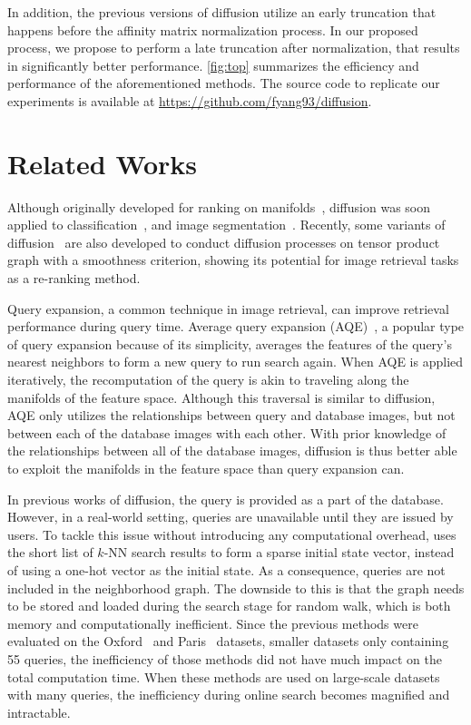 \documentclass[letterpaper]{article} \usepackage{aaai19}  \usepackage{times}  \usepackage{helvet}  \usepackage{courier}  \usepackage{url}  \usepackage{graphicx}  \frenchspacing  \setlength{\pdfpagewidth}{8.5in}  \setlength{\pdfpageheight}{11in}
\begin{document}
In addition, the previous versions of diffusion utilize an early truncation that happens before the affinity matrix normalization process.
In our proposed process, we propose to perform a late truncation after normalization, that results in significantly better performance.
\cref{fig:top} summarizes the efficiency and performance of the aforementioned methods.
The source code to replicate our experiments is available at \url{https://github.com/fyang93/diffusion}.


\section{Related Works}

Although originally developed for ranking on manifolds~\cite{page1999pagerank,zhou2004ranking,donoser2013diffusion}, diffusion was soon applied to classification~\cite{zhou2004learning}, and image segmentation~\cite{grady2006random}.
Recently, some variants of diffusion~\cite{bai2017regularized,bai2017ensemble,bai2018regularized,bai2019automatic} are also developed to conduct diffusion processes on tensor product graph with a smoothness criterion, showing its potential for image retrieval tasks as a re-ranking method.

Query expansion, a common technique in image retrieval, can improve retrieval performance during query time.
Average query expansion (AQE)~\cite{chum2007total,iscen2017efficient}, a popular type of query expansion because of its simplicity, averages the features of the query's nearest neighbors to form a new query to run search again. 
When AQE is applied iteratively, the recomputation of the query is akin to traveling along the manifolds of the feature space.
Although this traversal is similar to diffusion, AQE only utilizes the relationships between query and database images, but not between each of the database images with each other.
With prior knowledge of the relationships between all of the database images, diffusion is thus better able to exploit the manifolds in the feature space than query expansion can. 

In previous works of diffusion, the query is provided as a part of the database.
However, in a real-world setting, queries are unavailable until they are issued by users.
To tackle this issue without introducing any computational overhead, \cite{iscen2017efficient} uses the short list of $k$-NN search results to form a sparse initial state vector, instead of using a one-hot vector as the initial state.
As a consequence, queries are not included in the neighborhood graph.
The downside to this is that the graph needs to be stored and loaded during the search stage for random walk, which is both memory and computationally inefficient.
Since the previous methods were evaluated on the Oxford~\cite{philbin2007object} and Paris~\cite{philbin2008lost} datasets, smaller datasets only containing 55 queries, the inefficiency of those methods did not have much impact on the total computation time.
When these methods are used on large-scale datasets with many queries, the inefficiency during online search becomes magnified and intractable.
\end{document}

